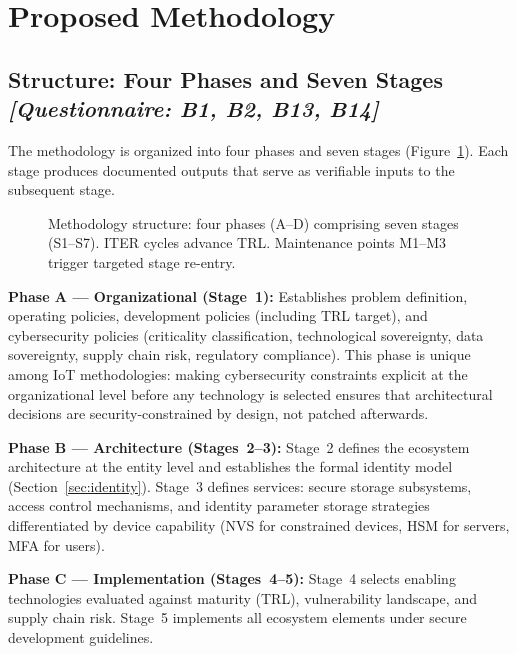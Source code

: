 \documentclass[12pt,a4paper]{article}
\newcommand{\qtag}[1]{\hfill\textcolor{gray!70}{\small\textit{[Questionnaire: #1]}}}
\begin{document}
\section{Proposed Methodology}
\label{sec:methodology}

\subsection{Structure: Four Phases and Seven Stages \qtag{B1, B2, B13, B14}}
\label{sec:structure}

The methodology is organized into four phases and seven stages (Figure~\ref{fig:metodologia}). Each stage produces documented outputs that serve as verifiable inputs to the subsequent stage.

\begin{figure}[htbp]
  \centering
  
  \caption{Methodology structure: four phases (A--D) comprising seven stages (S1--S7). ITER cycles advance TRL. Maintenance points M1--M3 trigger targeted stage re-entry.}
  \label{fig:metodologia}
\end{figure}

\textbf{Phase A --- Organizational (Stage~1):} Establishes problem definition, operating policies, development policies (including TRL target), and cybersecurity policies (criticality classification, technological sovereignty, data sovereignty, supply chain risk, regulatory compliance). This phase is unique among IoT methodologies: making cybersecurity constraints explicit at the organizational level before any technology is selected ensures that architectural decisions are security-constrained by design, not patched afterwards.

\textbf{Phase B --- Architecture (Stages~2--3):} Stage~2 defines the ecosystem architecture at the entity level and establishes the formal identity model (Section~\ref{sec:identity}). Stage~3 defines services: secure storage subsystems, access control mechanisms, and identity parameter storage strategies differentiated by device capability (NVS for constrained devices, HSM for servers, MFA for users).

\textbf{Phase C --- Implementation (Stages~4--5):} Stage~4 selects enabling technologies evaluated against maturity (TRL), vulnerability landscape, and supply chain risk. Stage~5 implements all ecosystem elements under secure development guidelines.
\end{document}
